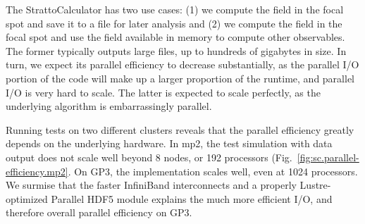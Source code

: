 \documentclass[11pt,SymmetricalJury]{inrsthesis/inrsthesis}
\begin{document}
The StrattoCalculator has two use cases: (1) we compute the field in the
focal spot and save it to a file for later analysis and (2) we compute the
field in the focal spot and use the field available in memory to compute
other observables. The former typically outputs large files, up to hundreds
of gigabytes in size. In turn, we expect its parallel efficiency to decrease
substantially, as the parallel I/O portion of the code will make up a larger
proportion of the runtime, and parallel I/O is very hard to scale. 
The latter is expected to scale perfectly, as the underlying algorithm is
embarrassingly parallel.

Running tests on two different clusters reveals that the parallel efficiency
greatly depends on the underlying hardware. In mp2, the test simulation
with data output does not scale well beyond 8 nodes, or 192 processors (Fig.~\ref{fig:sc.parallel-efficiency.mp2}.
On GP3, the implementation scales well, even at 1024 processors. We surmise that
the faster InfiniBand interconnects and a properly Lustre-optimized Parallel HDF5
module explains the much more efficient I/O, and therefore overall parallel efficiency
on GP3.
\end{document}
